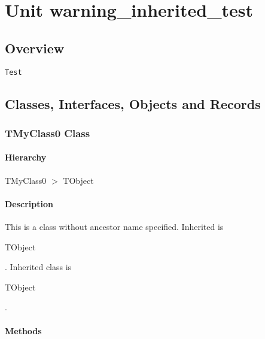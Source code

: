 \documentclass{report}
\begin{document}
\newlength{\tmplength}
\chapter{Unit warning{\_}inherited{\_}test}
\section{Overview}
\begin{description}
\item[\texttt{\begin{ttfamily}TMyClass0\end{ttfamily} Class}]
\item[\texttt{\begin{ttfamily}TMyClass1\end{ttfamily} Class}]
\item[\texttt{\begin{ttfamily}TMyClass2\end{ttfamily} Class}]
\end{description}
\begin{description}
\item[\texttt{Test}]
\end{description}
\section{Classes, Interfaces, Objects and Records}
\subsection*{TMyClass0 Class}
\subsubsection*{\large{\textbf{Hierarchy}}\normalsize\hspace{1ex}\hfill}
TMyClass0 {$>$} TObject
\subsubsection*{\large{\textbf{Description}}\normalsize\hspace{1ex}\hfill}
This is a class without ancestor name specified. Inherited is \begin{ttfamily}TObject\end{ttfamily}. Inherited class is \begin{ttfamily}TObject\end{ttfamily}.\subsubsection*{\large{\textbf{Methods}}\normalsize\hspace{1ex}\hfill}
\end{document}
